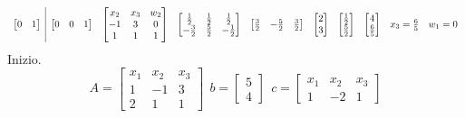 \begin{equation*}
{\begin{array}{ c|c c c c c c c c c c c c c }
\begin{bmatrix}
0 & 1
\end{bmatrix} & \begin{bmatrix}
0 & 0 & 1
\end{bmatrix} & \begin{bmatrix}
x_{2} & x_{3} & w_{2}\\
-1 & 3 & 0\\
1 & 1 & 1
\end{bmatrix} & \begin{bmatrix}
\frac{1}{2} & \frac{1}{2} & \frac{1}{2}\\
-\frac{3}{2} & \frac{5}{2} & -\frac{1}{2}
\end{bmatrix} & \begin{bmatrix}
\frac{3}{2} & -\frac{5}{2} & \frac{3}{2}
\end{bmatrix} & \begin{bmatrix}
2\\
3
\end{bmatrix} & \begin{bmatrix}
\frac{1}{2}\\
\frac{5}{2}
\end{bmatrix} & \begin{bmatrix}
4\\
\frac{6}{5}
\end{bmatrix} & x_{3} =\frac{6}{5} & w_{1} =0
\end{array}
}
\end{equation*}
Inizio.
\begin{equation*}
A=\begin{bmatrix}
x_{1} & x_{2} & x_{3}\\
1 & -1 & 3\\
2 & 1 & 1
\end{bmatrix} \ \ b=\begin{bmatrix}
5\\
4
\end{bmatrix} \ \ c=\begin{bmatrix}
x_{1} & x_{2} & x_{3}\\
1 & -2 & 1
\end{bmatrix}
\end{equation*}
